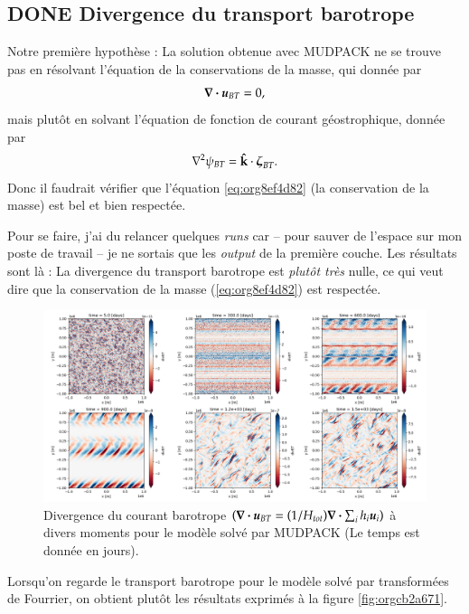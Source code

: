 \documentclass[10pt]{article}
\numberwithin{equation}{section}
\newcommand{\kvf}{\vb{\hat{k}}}
\newcommand{\uu}{\vb*{u}}
\begin{document}
\subsection{{\bfseries\sffamily DONE} Divergence du transport barotrope}
\label{sec:orgd10b58c}
Notre première hypothèse : La solution obtenue avec MUDPACK ne se trouve pas en résolvant l'équation de la conservations de la masse, qui donnée par
\begin{equation}
\label{eq:org8ef4d82}
   \div{\uu_{BT}} = 0,
\end{equation}
mais plutôt en solvant l'équation de fonction de courant géostrophique, donnée par
\begin{equation}
   \laplacian{\psi_{BT}} = \kvf \cdot \boldsymbol{\zeta}_{BT}.
\end{equation}
Donc il faudrait vérifier que l'équation \ref{eq:org8ef4d82} (la conservation de la masse) est bel et bien respectée.\bigskip

Pour se faire, j'ai du relancer quelques \emph{runs} car -- pour sauver de l'espace sur mon poste de travail -- je ne sortais que les \emph{output} de la première couche.
Les résultats sont là :
La divergence du transport barotrope est \emph{plutôt très} nulle, ce qui veut dire que la conservation de la masse (\ref{eq:org8ef4d82}) est respectée.

\begin{figure}[!htpb]
\centering
\includegraphics[width=.9\linewidth]{figures/debuggage/2023_06_21divBT1_MUD.png}
\caption{\label{fig:orgbe00611}Divergence du courant barotrope \(\qty(\div{\uu_{BT}} = \qty(1/H_{tot}) \div{\sum_i h_i \uu_i})\) à divers moments pour le modèle solvé par MUDPACK (Le temps est donnée en jours).}
\end{figure}

Lorsqu'on regarde le transport barotrope pour le modèle solvé par transformées de Fourrier, on obtient plutôt les résultats exprimés à la figure \ref{fig:orgcb2a671}. 
\end{document}
